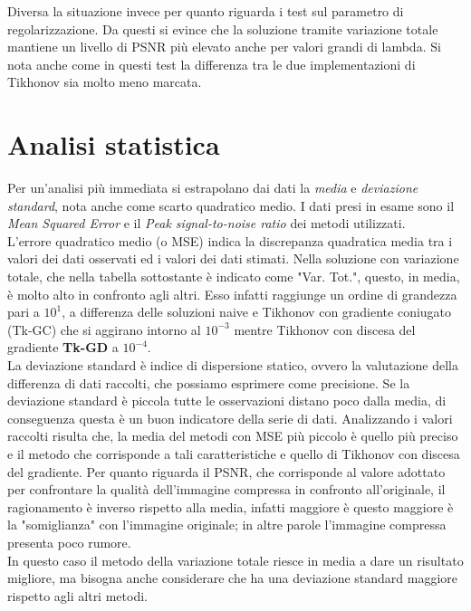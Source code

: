 \documentclass{article}
\begin{document}
Diversa la situazione invece per quanto riguarda i test sul parametro di regolarizzazione.
Da questi si evince che la soluzione tramite variazione totale mantiene un livello di PSNR
più elevato anche per valori grandi di lambda. Si nota anche come in questi test la 
differenza tra le due implementazioni di Tikhonov sia molto meno marcata.

\section{Analisi statistica} 
Per un'analisi più immediata si estrapolano dai dati la \textit{media} e
\textit{deviazione standard}, nota anche come scarto quadratico medio. I dati presi in
esame sono il \textit{Mean Squared Error} e il \textit{Peak signal-to-noise ratio} dei
metodi utilizzati.\\
L'errore quadratico medio (o MSE) indica la discrepanza quadratica media tra i valori dei
dati osservati ed i valori dei dati stimati. Nella soluzione con variazione totale, che
nella tabella sottostante è indicato  come "Var. Tot.", questo, in media, è molto alto in
confronto agli altri. Esso infatti raggiunge un ordine di grandezza pari a $10^1$, a
differenza delle soluzioni naive e Tikhonov con gradiente coniugato (Tk-GC) che si
aggirano intorno al $10^{-3}$ mentre Tikhonov con discesa del gradiente \textbf{Tk-GD} a
$10^{-4}$.\\
La deviazione standard è indice di dispersione statico, ovvero la valutazione della differenza di dati raccolti, che possiamo esprimere come precisione. 
Se la deviazione standard è piccola tutte le osservazioni distano poco dalla media, di conseguenza questa è un buon indicatore della serie di dati. Analizzando i valori raccolti risulta che, la media del metodi con MSE più piccolo è quello più preciso e il metodo che corrisponde a tali caratteristiche e quello di Tikhonov con discesa del gradiente.
Per quanto riguarda il PSNR, che corrisponde al valore adottato per confrontare la qualità
dell'immagine compressa in confronto all'originale, il ragionamento è inverso rispetto
alla media, infatti maggiore è questo maggiore è la "somiglianza" con l'immagine originale; in altre parole l'immagine compressa presenta poco rumore.\\
In questo caso il metodo della variazione totale riesce in media a dare un risultato migliore, ma bisogna anche considerare che ha una deviazione standard maggiore rispetto agli altri metodi.
\end{document}

